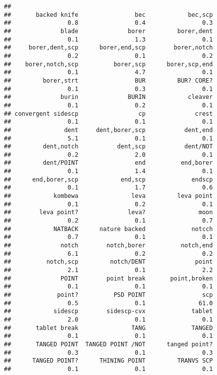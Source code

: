 \documentclass[]{article}
\begin{document}
\begin{verbatim}
## 
##       backed knife                bec            bec,scp 
##                0.8                0.4                0.3 
##              blade              borer         borer,dent 
##                0.1                1.3                0.1 
##     borer,dent,scp      borer,end,scp        borer,notch 
##                0.2                0.1                0.2 
##    borer,notch,scp          borer,scp      borer,scp,end 
##                0.1                4.7                0.1 
##         borer,strt                BUR         BUR? CORE? 
##                0.1                0.3                0.1 
##              burin              BURIN            cleaver 
##                0.1                0.2                0.1 
## convergent sidescp                 cp              crest 
##                0.1                0.1                0.1 
##               dent     dent,borer,scp           dent,end 
##                5.1                0.1                0.1 
##         dent,notch           dent,scp           dent/NOT 
##                0.2                2.0                0.1 
##         dent/POINT                end          end,borer 
##                0.1                1.4                0.1 
##      end,borer,scp            end,scp             endscp 
##                0.1                1.7                0.6 
##            kombewa               leva         leva point 
##                0.1                0.2                0.1 
##        leva point?              leva?               moon 
##                0.2                0.1                0.7 
##            NATBACK      nature backed             notcch 
##                0.7                0.1                0.1 
##              notch        notch,borer          notch,end 
##                6.1                0.2                0.2 
##          notch,scp         notch/DENT              point 
##                2.1                0.1                2.2 
##              POINT        point break       point,broken 
##                0.1                0.1                0.1 
##             point?          PSD POINT                scp 
##                0.5                0.1               61.0 
##            sidescp        sidescp-cvx             tablet 
##                2.0                0.1                0.1 
##       tablet break               TANG             TANGED 
##                0.1                0.1                0.1 
##       TANGED POINT  TANGED POINT /NOT      tanged point? 
##                0.3                0.1                0.3 
##      TANGED POINT?      THINING POINT         TRANVS SCP 
##                0.1                0.1                0.1
\end{verbatim}
\end{document}

